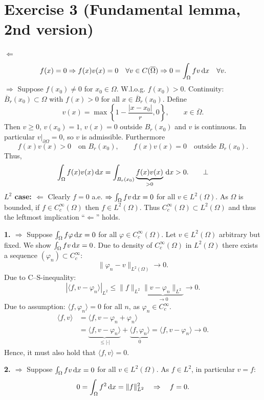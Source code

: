 ﻿\documentclass[11pt,a4paper]{article}
\begin{document}
\section*{Exercise 3 (Fundamental lemma, 2nd version)}
\textbf{$\Leftarrow$}
\[
f(x)=0\Rightarrow f(x)v(x)=0\quad\forall v\in C(\overline\Omega)
\Rightarrow 0=\int_\Omega fv\,\mathrm{d}x\quad\forall v.
\]
\textbf{$\Rightarrow$} Suppose $f(x_0)\ne0$ for $x_0\in\Omega$.
W.l.o.g. $f(x_0)>0$. Continuity:
$\overline B_r(x_0)\subset\Omega$ with $f(x)>0$ for all
$x\in\overline B_r(x_0)$. Define
\[
v(x)=\max\left\{1-\frac{|x-x_0|}{r},0\right\},\qquad x\in\overline\Omega.
\]
Then $v\ge0$, $v(x_0)=1$, $v(x)=0$ outside $B_r(x_0)$ and $v$ is continuous.
In particular $v|_{\partial\Omega}=0$, so $v$ is admissible. Furthermore
\[
f(x)v(x)>0\quad\text{on }B_r(x_0),\qquad
f(x)v(x)=0\quad\text{outside }B_r(x_0).
\]
Thus,
\[
\int_\Omega f(x)v(x)\,\mathrm{d}x=\int_{B_r(x_0)}\underbrace{f(x)v(x)}_{>0}\,\mathrm{d}x>0.\qquad\bot
\]
\textbf{$L^2$ case: $\Leftarrow$}
Clearly $f=0$ a.e. $\Rightarrow\int_\Omega fv\,\mathrm{d}x=0$ for all $v\in L^2(\Omega)$.
As $\Omega$ is bounded, if $f\in C_c^\infty(\Omega)$ then $f\in L^2(\Omega)$.
Thus $C_c^\infty(\Omega)\subset L^2(\Omega)$ and thus the leftmost
implication ``$\Leftarrow$'' holds.

\textbf{1. $\Rightarrow$} Suppose $\int_\Omega f\varphi\,\mathrm{d}x=0$
for all $\varphi\in C_c^\infty(\Omega)$.
Let $v\in L^2(\Omega)$ arbitrary but fixed. We show $\int_\Omega fv\,\mathrm{d}x=0$.
Due to density of $C_c^\infty(\Omega)$ in $L^2(\Omega)$ there exists a
sequence $(\varphi_n)\subset C_c^\infty$:
\[
\|\varphi_n-v\|_{L^2(\Omega)}\to0.
\]
Due to C--S-inequality:
\[
|\langle f,v-\varphi_n\rangle|_{L^2}
\le\|f\|_{L^2}\underbrace{\|v-\varphi_n\|_{L^2}}_{\to0}\to0.
\]
Due to assumption: $\langle f,\varphi_n\rangle=0$ for all $n$,
as $\varphi_n\in C_c^\infty$.
\begin{align*}
\langle f,v\rangle
&=\langle f,v-\varphi_n+\varphi_n\rangle\\
&=\underbrace{\langle f,v-\varphi_n\rangle}_{\le |\cdot|}
+\underbrace{\langle f,\varphi_n\rangle}_{0}
=\langle f,v-\varphi_n\rangle\to0.
\end{align*}
Hence, it must also hold that $\langle f,v\rangle=0$.

\textbf{2. $\Rightarrow$} Suppose $\int_\Omega fv\,\mathrm{d}x=0$ for all $v\in L^2(\Omega)$.
As $f\in L^2$, in particular $v=f$:
\[
0=\int_\Omega f^2\,\mathrm{d}x=\|f\|_{L^2}^2\quad\Rightarrow\quad f=0.
\]

\newpage
\end{document}
